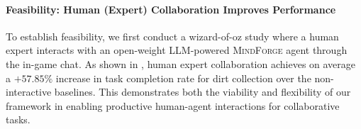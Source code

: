 \documentclass{article}
\newcommand{\collabvoyager}[0]{\mbox{\textsc{MindForge}}\xspace}
\begin{document}
\paragraph{Feasibility: Human (Expert) Collaboration Improves Performance} To establish feasibility, we first conduct a wizard-of-oz study where a human expert interacts with an open-weight LLM-powered \collabvoyager agent through the in-game chat. As shown in , human expert collaboration achieves on average a $+57.85\%$ increase in task completion rate for dirt collection over the non-interactive baselines. This demonstrates both the viability and flexibility of our framework in enabling productive human-agent interactions for collaborative tasks.

    
\end{document}
